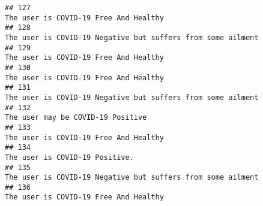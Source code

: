 \documentclass[
]{article}
\begin{document}
\begin{verbatim}
## 127                                                                                                                                                                                                                              The user is COVID-19 Free And Healthy
## 128                                                                                                                                                                                                        The user is COVID-19 Negative but suffers from some ailment
## 129                                                                                                                                                                                                                              The user is COVID-19 Free And Healthy
## 130                                                                                                                                                                                                                              The user is COVID-19 Free And Healthy
## 131                                                                                                                                                                                                        The user is COVID-19 Negative but suffers from some ailment
## 132                                                                                                                                                                                                                                  The user may be COVID-19 Positive
## 133                                                                                                                                                                                                                              The user is COVID-19 Free And Healthy
## 134                                                                                                                                                                                                                                     The user is COVID-19 Positive.
## 135                                                                                                                                                                                                        The user is COVID-19 Negative but suffers from some ailment
## 136                                                                                                                                                                                                                              The user is COVID-19 Free And Healthy

\end{verbatim}
\end{document}
